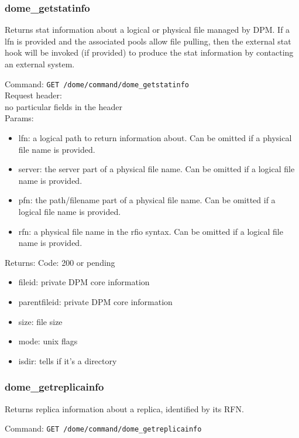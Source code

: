 \documentclass[a4paper,10pt]{scrreprt}
\begin{document}
\subsubsection{dome\_getstatinfo}
Returns stat information about a logical or physical file managed by DPM.
If a lfn is provided and the associated pools allow file pulling, then the external stat hook will be invoked (if provided)
to produce the stat information by contacting an external system.

Command:
\lstinline"GET /dome/command/dome_getstatinfo"\\

Request header:\\
no particular fields in the header\\

Params:
\begin{itemize}
 \item lfn: a logical path to return information about. Can be omitted if a physical file name is provided.
 \item server: the server part of a physical file name. Can be omitted if a logical file name is provided.
 \item pfn: the path/filename part of a physical file name. Can be omitted if a logical file name is provided.
 \item rfn: a physical file name in the rfio syntax. Can be omitted if a logical file name is provided.
\end{itemize}

Returns:
Code: 200 or pending
\begin{itemize}
 \item fileid: private DPM core information
 \item parentfileid: private DPM core information
 \item size: file size
 \item mode: unix flags
 \item isdir: tells if it's a directory
\end{itemize}



\subsubsection{dome\_getreplicainfo}
Returns replica information about a replica, identified by its RFN.

Command:
\lstinline"GET /dome/command/dome_getreplicainfo"\\
\end{document}
